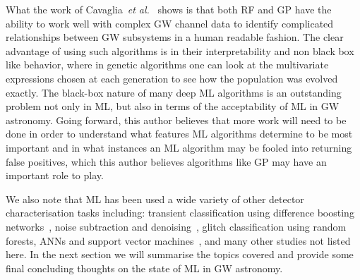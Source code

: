 %
What the work of Cavaglia~\textit{et al.}~\cite{CiCP-25-963} shows is 
that both \ac{RF} and \ac{GP} have the ability to work well with 
complex \ac{GW} channel data to identify complicated 
relationships between \ac{GW} subsystems in a human readable 
fashion. The clear advantage of using such algorithms is 
in their interpretability and non black box like 
behavior, where in genetic algorithms one can look at the multivariate 
expressions chosen at each generation to see how the population was evolved exactly. 
The black-box nature of many deep \ac{ML} algorithms is an 
outstanding problem not only in \ac{ML}, but also in terms 
of the acceptability of \ac{ML} in \ac{GW} astronomy. Going 
forward, this author believes that more work will need to be 
done in order to understand what features \ac{ML} algorithms 
determine to be most important and in what instances an 
\ac{ML} algorithm may be fooled into returning false positives, which 
this author believes algorithms like \ac{GP} may have an important role to play.


%
%
We also note that \ac{ML} has been used a wide variety of other 
detector characterisation tasks including: transient 
classification using difference boosting networks~\cite{PhysRevD.95.104059}, 
noise subtraction and 
denoising~\cite{PhysRevResearch.2.033066,PhysRevD.101.042003},
glitch classification using random forests, \acp{ANN} and 
support vector machines~\cite{PhysRevD.88.062003}, and many other 
studies not listed here. In the next section we will summarise the 
topics covered and 
provide some final concluding thoughts on the state of \ac{ML} in 
\ac{GW} astronomy.


